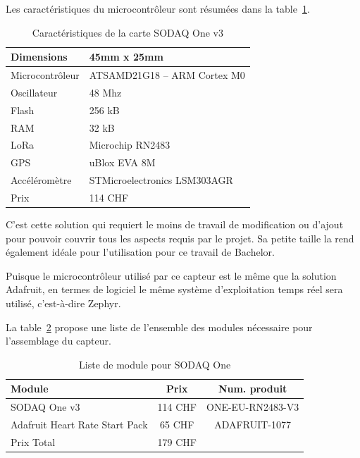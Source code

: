 Les caractéristiques du microcontrôleur sont résumées dans la table~\ref{tab:sodaq_one_cara}.

\begin{table}[htb]
\caption[Caractéristiques de la carte SODAQ One v3]{Caractéristiques de la carte SODAQ One v3}
\label{tab:sodaq_one_cara}
\centering
\begin{tabular}{ l | l }
\toprule
Dimensions & 45mm x 25mm \\
\midrule
Microcontrôleur & ATSAMD21G18 – ARM Cortex M0 \\
\midrule
Oscillateur & 48 Mhz \\
\midrule
Flash & 256 kB \\
\midrule
RAM & 32 kB \\
\midrule
LoRa & Microchip RN2483 \\
\midrule
GPS & uBlox EVA 8M \\
\midrule
Accéléromètre & STMicroelectronics LSM303AGR \\
\midrule
Prix & 114 CHF\\
\bottomrule 
\end{tabular}
\end{table}

C’est cette solution qui requiert le moins de travail de modification ou d’ajout pour pouvoir couvrir tous les aspects requis par le projet. Sa petite taille la rend également idéale pour l’utilisation pour ce travail de Bachelor.

Puisque le microcontrôleur utilisé par ce capteur est le même que la solution Adafruit, en termes de logiciel le même système d’exploitation temps réel sera utilisé, c’est-à-dire Zephyr.

La table~\ref{tab:sodaq_one_liste} propose une liste de l'ensemble des modules nécessaire pour l'assemblage du capteur.

\begin{table}[htb]
\caption[Liste de module pour SODAQ One]{Liste de module pour SODAQ One}
\label{tab:sodaq_one_liste}
\centering
\begin{tabular}{lcc}
\toprule
Module & Prix & Num. produit \\ 
\midrule
SODAQ One v3 & 114 CHF & ONE-EU-RN2483-V3 \\
Adafruit Heart Rate Start Pack & 65 CHF & ADAFRUIT-1077 \\
\midrule
Prix Total & 179 CHF &  \\
\bottomrule 
\end{tabular}
\end{table}

